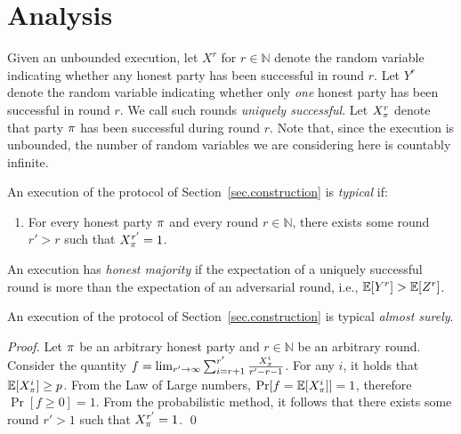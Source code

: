 \section{Analysis}

Given an unbounded execution, let $X^r$ for $r \in \mathbb{N}$ denote the random
variable indicating whether any honest party has been successful in round $r$.
Let $Y^r$ denote the random variable indicating whether only \emph{one} honest
party has been successful in round $r$. We call such rounds \emph{uniquely
successful}. Let $X^r_\pi$ denote that party $\pi$ has been successful
during round $r$. Note that, since the execution is unbounded, the number of
random variables we are considering here is countably infinite.

\begin{definition}
  An execution of the protocol of Section~\ref{sec.construction} is
  \emph{typical} if:

  \begin{enumerate}
    \item For every honest party $\pi$ and every round $r \in \mathbb{N}$,
          there exists some round $r' > r$ such that $X^{r'}_\pi = 1$.
  \end{enumerate}
\end{definition}

\begin{definition}
  An execution has \emph{honest majority} if the expectation of a uniquely
  successful round is more than the expectation of an adversarial round, i.e.,
  $\mathop{{}\mathbb{E}}[Y^r] > \mathop{{}\mathbb{E}}[Z^r]$.
\end{definition}

\begin{theorem}[Typicality]
  An execution of the protocol of Section~\ref{sec.construction} is typical
  \emph{almost surely}.
\end{theorem}
\begin{proof}
  Let $\pi$ be an arbitrary honest party and $r \in \mathbb{N}$ be an
  arbitrary round. Consider the quantity
  $f = \lim_{r' \to \infty} \sum_{i = r + 1}^{r'} \frac{X^{i}_\pi}{r' - r - 1}$.
  For any $i$, it holds that
  $\mathop{{}\mathbb{E}}[X^i_\pi] \geq p$. From the Law of Large numbers, $\Pr[f =
  \mathop{{}\mathbb{E}}[X^i_\pi]] = 1$, therefore $\Pr[f \geq 0] = 1$. From the probabilistic
  method, it follows that there exists some round $r' > 1$ such that
  $X^{r'}_\pi = 1$.
  \qed
\end{proof}

